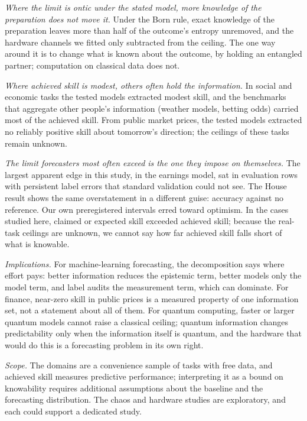 \documentclass[journal]{IEEEtran}
\theoremstyle{definition}
\begin{document}
\emph{Where the limit is ontic under the stated model, more knowledge of the preparation does not move it.} Under the Born rule, exact knowledge of the preparation leaves more than half of the outcome's entropy unremoved, and the hardware channels we fitted only subtracted from the ceiling. The one way around it is to change what is known about the outcome, by holding an entangled partner; computation on classical data does not.

\emph{Where achieved skill is modest, others often hold the information.} In social and economic tasks the tested models extracted modest skill, and the benchmarks that aggregate other people's information (weather models, betting odds) carried most of the achieved skill. From public market prices, the tested models extracted no reliably positive skill about tomorrow's direction; the ceilings of these tasks remain unknown.

\emph{The limit forecasters most often exceed is the one they impose on themselves.} The largest apparent edge in this study, in the earnings model, sat in evaluation rows with persistent label errors that standard validation could not see. The House result shows the same overstatement in a different guise: accuracy against no reference. Our own preregistered intervals erred toward optimism. In the cases studied here, claimed or expected skill exceeded achieved skill; because the real-task ceilings are unknown, we cannot say how far achieved skill falls short of what is knowable.

\emph{Implications.} For machine-learning forecasting, the decomposition says where effort pays: better information reduces the epistemic term, better models only the model term, and label audits the measurement term, which can dominate. For finance, near-zero skill in public prices is a measured property of one information set, not a statement about all of them. For quantum computing, faster or larger quantum models cannot raise a classical ceiling; quantum information changes predictability only when the information itself is quantum, and the hardware that would do this is a forecasting problem in its own right.

\emph{Scope.} The domains are a convenience sample of tasks with free data, and achieved skill measures predictive performance; interpreting it as a bound on knowability requires additional assumptions about the baseline and the forecasting distribution. The chaos and hardware studies are exploratory, and each could support a dedicated study.
\end{document}
